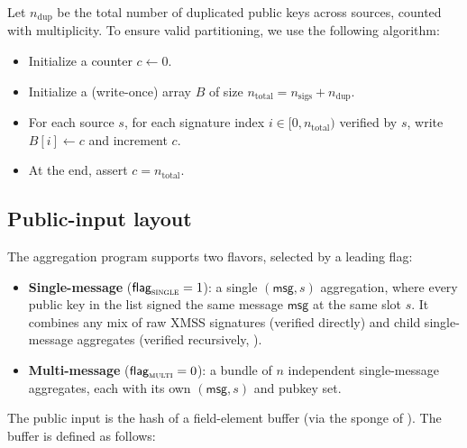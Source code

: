 \documentclass{article}
\theoremstyle{definition}
\begin{document}
Let $n_{\text{dup}}$ be the total number of duplicated public keys across sources, counted with multiplicity. To ensure valid partitioning, we use the following algorithm:

\begin{itemize}
    \item Initialize a counter $c \gets 0$.
    \item Initialize a (write-once) array $B$ of size $n_{\text{total}} = n_{\text{sigs}} + n_{\text{dup}}$.
    \item For each source $s$, for each signature index $i \in [0, n_{\text{total}})$ verified by $s$, write $B[i] \gets c$ and increment $c$.
    \item At the end, assert $c = n_{\text{total}}$.
\end{itemize}


\subsection{Public-input layout}\label{sec:aggregation-layout}

The aggregation program supports two flavors, selected by a leading flag:
\begin{itemize}
    \item \textbf{Single-message} ($\textsf{flag}_\textsc{single} = 1$): a single $(\textsf{msg}, s)$ aggregation, where every public key in the list signed the same message $\textsf{msg}$ at the same slot $s$. It combines any mix of raw XMSS signatures (verified directly) and child single-message aggregates (verified recursively, ).
    \item \textbf{Multi-message} ($\textsf{flag}_\textsc{multi} = 0$): a bundle of $n$ independent single-message aggregates, each with its own $(\textsf{msg}, s)$ and pubkey set.
\end{itemize}

The public input is the hash of a field-element buffer (via the sponge of ). The buffer is defined as follows:
\end{document}
